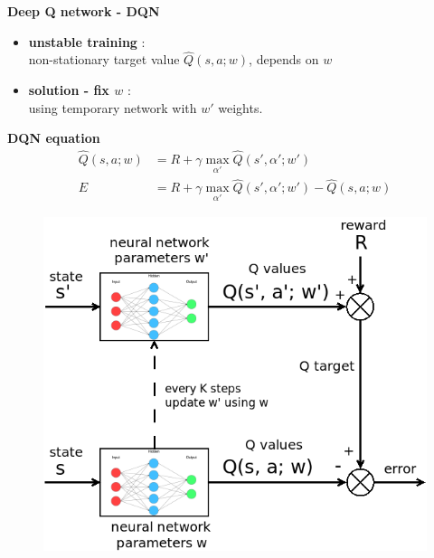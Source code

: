\documentclass[xcolor=dvipsnames]{beamer}
\begin{document}
\begin{frame}{\bf Deep Q network - DQN}

\begin{itemize}
\item {\bf \color{red} unstable training} : \\
non-stationary target value $\hat{Q}(s, a; w)$, depends on $w$
\item {\bf \color{red} solution - fix $w$} : \\
using temporary network with $w'$ weights.
\end{itemize}
{\bf DQN equation}
\begin{align*}
  \hat{Q}(s, a; w) &= R + \gamma \max \limits_{\alpha'} \hat{Q}(s', \alpha'; w') \\
  E &= R + \gamma \max \limits_{\alpha'} \hat{Q}(s', \alpha'; w') - \hat{Q}(s, a; w)
  \label{eq:dqn}
\end{align*}

\begin{figure}[!htb]
  \centering
  \includegraphics[scale=0.2]{../../diagrams/dqn.png}
  \label{img:dqn}
\end{figure}



\end{frame}
\end{document}
